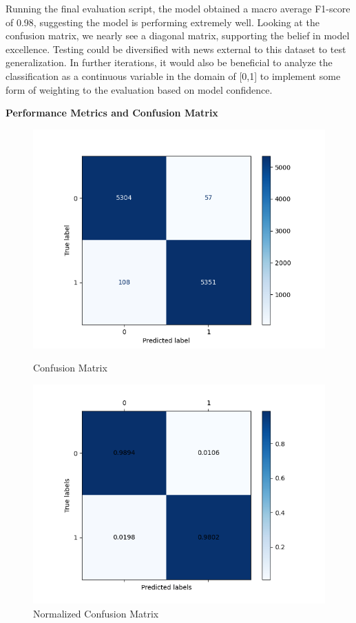 \documentclass[12pt]{article}
\begin{document}
Running the final evaluation script, the model obtained a macro average F1-score of 0.98, suggesting the model is performing extremely well. Looking at the confusion matrix, we nearly see a diagonal matrix, supporting the belief in model excellence. Testing could be diversified with news external to this dataset to test generalization. In further iterations, it would also be beneficial to analyze the classification as a continuous variable in the domain of [0,1] to implement some form of weighting to the evaluation based on model confidence. \\
\begin{center}
\textbf{Performance Metrics and Confusion Matrix}
\end{center}
\begin{figure}[h]
  \centering
  \begin{minipage}{0.48\textwidth}
    \centering
    \includegraphics[width=\linewidth]{confusion}
    \caption{Confusion Matrix}
  \end{minipage}
  \hfill
  \begin{minipage}{0.48\textwidth}
    \centering
    \includegraphics[width=\linewidth]{norm_confusion}
    \caption{Normalized Confusion Matrix\\~\\}
  \end{minipage}
\end{figure}
\end{document}
